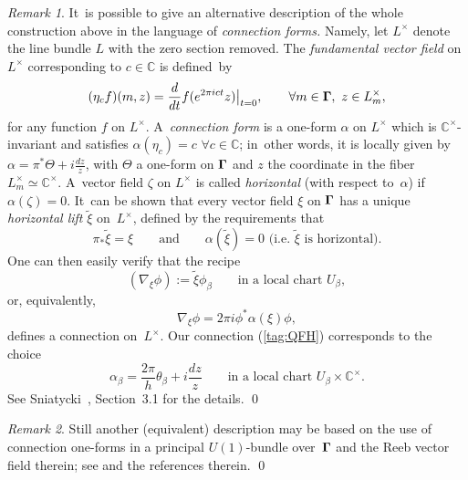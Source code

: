 \documentclass[12pt]{amsart}
\numberwithin{equation}{section}
\theoremstyle{remark}
\newtheorem{remark*}{Remark}
\newcommand\Omg{{\bigam}}   %
\newcommand{\CC}{\C}
\newcommand{\bigam}{\mbox{\boldmath $\Gamma$}}
\newcommand{\C}{\mathbb C}
\begin{document}
\begin{remark*} It~is possible to give an alternative description of the whole
construction above in the language of {\it connection forms.\/} Namely, let
$L^\times$ denote the line bundle $L$ with the zero section removed. The {\it
fundamental vector field\/} on $L^\times$ corresponding to $c\in\CC$ is
defined~by
$$ (\eta_c f)(m,z)=\frac d{dt} f(e^{2\pi i c t}z) \big|_{t=0}, \qquad
\forall m\in \Omg,\ z\in L^\times_m,  $$
for any function $f$ on $L^\times$. A~{\it connection form\/} is a one-form
$\alpha$ on $L^\times$ which is $\CC^\times$-invariant and satisfies $\alpha
(\eta_c)=c$ $\forall c\in\CC$; in~other words, it is locally given by $\alpha
=\pi^*\Theta+i\frac{dz}z$, with $\Theta$ a one-form on $\Omg$ and $z$ the
coordinate in the fiber $L^\times_m\simeq\CC^\times$. A~vector field $\zeta$ on
$L^\times$ is called {\it horizontal\/} (with respect to~$\alpha$) if $\alpha
(\zeta)=0$. It~can be shown that every vector field $\xi$ on $\Omg$ has a
unique {\it horizontal lift\/} $\tilde\xi$ on~$L^\times$, defined by the
requirements that
$$ \pi_*\tilde\xi=\xi\qquad\text{and}\qquad \alpha(\tilde\xi)=0
\text{ (i.e.~$\tilde\xi$ is horizontal).}  $$
One can then easily verify that the recipe
$$ (\nabla_\xi \phi) := \tilde\xi \phi_\beta
\qquad\text{in a local chart }U_\beta, $$
or, equivalently,
$$ \nabla_\xi \phi = 2\pi i \phi^*\alpha(\xi) \phi,  $$
defines a connection on~$L^\times$. Our connection (\ref{tag:QFH}) corresponds
to the choice
$$ \alpha_\beta = \frac{2\pi}h \theta_\beta + i\frac{dz}z \qquad
\text{in a local chart } U_\beta\times\CC^\times.  $$
See Sniatycki~\cite{bib:SniaB}, Section~3.1 for the details.   \qed
\end{remark*}

\begin{remark*} Still another (equivalent) description may be based on the use
of connection one-forms in a principal $U(1)$-bundle over~$\Omg$ and the Reeb
vector field therein; see \cite{bib:TuyIrr} and the references therein.   \qed
\end{remark*}

\medskip
\end{document}
